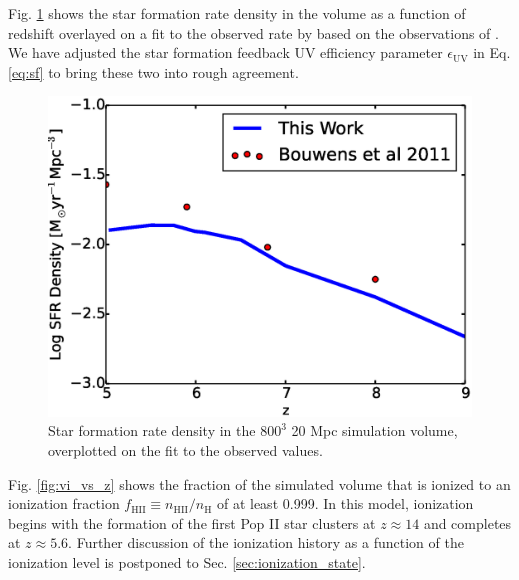 \documentclass[letterpaper,10pt]{article}
\renewcommand{\(}{\left(}
\renewcommand{\)}{\right)}
\begin{document}
Fig. \ref{fig:sfrd} shows the star formation rate density in the volume as a function of redshift overlayed on a fit to the observed rate by \citep{HaardtMadau2012} based on the observations of \citep{Bouwensetal2011}. We have adjusted the star formation feedback UV efficiency parameter $\epsilon_\mathrm{UV}$ in Eq. \ref{eq:sf} to bring these two into rough agreement. 

\begin{figure}
  \includegraphics[scale=0.45]{compareSFR_haardt_madau2012.eps}
  \caption{\footnotesize Star formation rate density in the $800^3$ 20 Mpc simulation volume, overplotted on the \citep{HaardtMadau2012} fit to the observed values.}
  \label{fig:sfrd}
\end{figure}

Fig. \ref{fig:vi_vs_z} shows the fraction of the simulated volume that is ionized to an ionization
fraction $f_\mathrm{HII} \equiv n_\mathrm{HII}/n_\mathrm{H}$ of at least 0.999. In this model, ionization begins with 
the formation of the first Pop II star clusters at $z\approx 14$ and completes at $z\approx 5.6$. Further 
discussion of the ionization history as a function of the ionization level is postponed to
Sec. \ref{sec:ionization_state}. 
\end{document}
